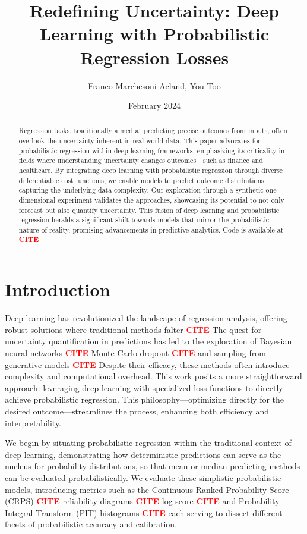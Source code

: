 \documentclass{article}
\title{Redefining Uncertainty: Deep Learning with Probabilistic Regression Losses}
\author{Franco Marchesoni-Acland, You Too}
\date{February 2024}
\newcommand{\citee}[1]{\textbf{\textcolor{red}{CITE}}}
\begin{document}
\maketitle

\begin{abstract}
Regression tasks, traditionally aimed at predicting precise outcomes from inputs, often overlook the uncertainty inherent in real-world data. This paper advocates for probabilistic regression within deep learning frameworks, emphasizing its criticality in fields where understanding uncertainty changes outcomes—such as finance and healthcare. By integrating deep learning with probabilistic regression through diverse differentiable cost functions, we enable models to predict outcome distributions, capturing the underlying data complexity. Our exploration through a synthetic one-dimensional experiment validates the approaches, showcasing its potential to not only forecast but also quantify uncertainty. This fusion of deep learning and probabilistic regression heralds a significant shift towards models that mirror the probabilistic nature of reality, promising advancements in predictive analytics. Code is available at \citee.
\end{abstract}

\section{Introduction}
Deep learning has revolutionized the landscape of regression analysis, offering robust solutions where traditional methods falter \citee. The quest for uncertainty quantification in predictions has led to the exploration of Bayesian neural networks \citee, Monte Carlo dropout \citee, and sampling from generative models \citee. Despite their efficacy, these methods often introduce complexity and computational overhead. This work posits a more straightforward approach: leveraging deep learning with specialized loss functions to directly achieve probabilistic regression. This philosophy—optimizing directly for the desired outcome—streamlines the process, enhancing both efficiency and interpretability.

We begin by situating probabilistic regression within the traditional context of deep learning, demonstrating how deterministic predictions can serve as the nucleus for probability distributions, so that mean or median predicting methods can be evaluated probabilistically. We evaluate these simplistic probabilistic models, introducing metrics such as the Continuous Ranked Probability Score (CRPS) \citee, reliability diagrams \citee, log score \citee, and Probability Integral Transform (PIT) histograms \citee, each serving to dissect different facets of probabilistic accuracy and calibration.
\end{document}
